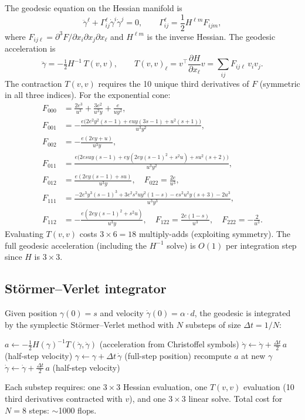 \documentclass[11pt]{article}
\begin{document}
The geodesic equation on the Hessian manifold is
\begin{equation}\label{eq:geodesic-ode}
  \ddot\gamma^\ell + \Gamma^\ell_{ij} \dot\gamma^i \dot\gamma^j = 0,
  \qquad
  \Gamma^\ell_{ij} = \frac{1}{2} H^{\ell m} F_{ijm},
\end{equation}
where $F_{ij\ell} = \partial^3 F / \partial x_i \partial x_j \partial x_\ell$
and $H^{\ell m}$ is the inverse Hessian.  The geodesic acceleration is
\[
  \ddot\gamma = -\tfrac{1}{2} H^{-1} \, T(v, v),
  \qquad
  T(v,v)_\ell = v^\top \frac{\partial H}{\partial x_\ell} v = \sum_{ij} F_{ij\ell} \, v_i v_j.
\]
The contraction $T(v,v)$ requires the 10 unique third derivatives of $F$
(symmetric in all three indices).  For the exponential cone:
\begin{align}
  F_{000} &= \frac{2e^3}{u^3} + \frac{3e^2}{u^2 y} + \frac{e}{u y^2}, \\
  F_{001} &= -\frac{e\bigl(2e^2 y^2(s{-}1) + euy(3s{-}1) + u^2(s{+}1)\bigr)}{u^3 y^2}, \\
  F_{002} &= -\frac{e(2ey + u)}{u^3 y}, \\
  F_{011} &= \frac{e\bigl(2esu y(s{-}1) + ey(2ey(s{-}1)^2 + s^2 u) + su^2(s{+}2)\bigr)}{u^3 y^2}, \\
  F_{012} &= \frac{e(2ey(s{-}1) + su)}{u^3 y}, \quad
  F_{022} = \frac{2e}{u^3}, \\
  F_{111} &= \frac{-2e^3 y^3(s{-}1)^3 + 3e^2 s^2 uy^2(1{-}s) - es^2 u^2 y(s{+}3) - 2u^3}{u^3 y^3}, \\
  F_{112} &= -\frac{e(2ey(s{-}1)^2 + s^2 u)}{u^3 y}, \quad
  F_{122} = \frac{2e(1{-}s)}{u^3}, \quad
  F_{222} = -\frac{2}{u^3}.
\end{align}
Evaluating $T(v,v)$ costs $3 \times 6 = 18$ multiply-adds (exploiting symmetry).
The full geodesic acceleration (including the $H^{-1}$ solve) is $O(1)$ per
integration step since $H$ is $3 \times 3$.

\subsection{St\"ormer--Verlet integrator}

Given position $\gamma(0) = s$ and velocity $\dot\gamma(0) = \alpha \cdot d$, the
geodesic is integrated by the symplectic St\"ormer--Verlet method with $N$ substeps
of size $\Delta t = 1/N$:
\begin{algorithmic}[1]
  \State $a \gets -\frac{1}{2} H(\gamma)^{-1} T(\dot\gamma, \dot\gamma)$
    \hfill (acceleration from Christoffel symbols)
  \State $\dot\gamma \gets \dot\gamma + \frac{\Delta t}{2} \, a$
    \hfill (half-step velocity)
  \State $\gamma \gets \gamma + \Delta t \, \dot\gamma$
    \hfill (full-step position)
  \State recompute $a$ at new $\gamma$
  \State $\dot\gamma \gets \dot\gamma + \frac{\Delta t}{2} \, a$
    \hfill (half-step velocity)
\EndFor
\end{algorithmic}
Each substep requires: one $3\times 3$ Hessian evaluation, one $T(v,v)$ evaluation
(10 third derivatives contracted with $v$), and one $3\times 3$ linear solve.
Total cost for $N = 8$ steps: $\sim$1000 flops.
\end{document}
